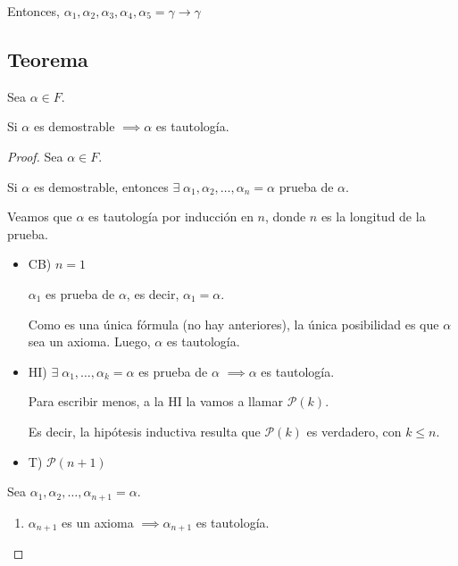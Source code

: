 Entonces, $\alpha_1, \alpha_2, \alpha_3, \alpha_4, \alpha_5=\gamma \to \gamma$

\subsection{Teorema}


\begin{teorema}{}{}
    Sea $\alpha \in F$.

    \medskip

    Si $\alpha$ es demostrable $\implies \alpha$ es tautología.
\end{teorema}

\begin{proof} \phantom{.}
    
    Sea $\alpha \in F$.

    Si $\alpha$ es demostrable, entonces $\exists \; \alpha_1,
    \alpha_2, \dotsc, \alpha_n=\alpha$ prueba de $\alpha$.

    Veamos que $\alpha$ es tautología por inducción en $n$, donde $n$ es la 
    longitud de la prueba.

    \begin{itemize}
        \item CB) $n=1$

            $\alpha_1$ es prueba de $\alpha$, es decir, $\alpha_1=\alpha$.

            Como es una única fórmula (no hay anteriores), la única 
            posibilidad es que $\alpha$ sea un axioma. Luego, $\alpha$ es
            tautología.

        \item HI) $\exists \; \alpha_1, \dotsc, \alpha_k = \alpha$ es prueba 
            de $\alpha$ $\implies \alpha$ es tautología.

            Para escribir menos, a la HI la vamos a llamar $\mathcal{P}(k)$.

            Es decir, la hipótesis inductiva resulta que $\mathcal{P}(k)$ es
            verdadero, con $k \leq n$.

        \item T) $\mathcal{P}(n+1)$
    \end{itemize}
    

    Sea $\alpha_1, \alpha_2, \dotsc, \alpha_{n+1} = \alpha$.

    \begin{enumerate}[%
                    labelindent=*,
                    style=multiline,
                    leftmargin=*,
                    align=left,
                    leftmargin=2\parindent,
                    label=Caso \arabic*)]
        \item $\alpha_{n+1}$ es un axioma $\implies \alpha_{n+1}$  es 
            tautología.


\end{enumerate}
\end{proof}
